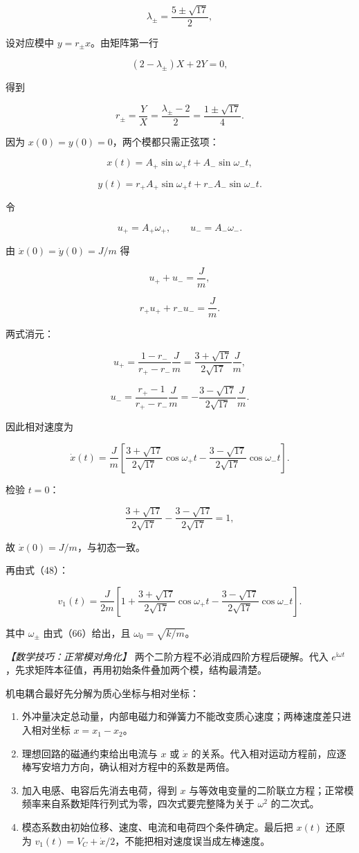 \documentclass[12pt,a4paper,UTF8]{ctexart}
\newcommand{\tightlist}{\setlength{\itemsep}{0pt}\setlength{\parskip}{0pt}}
\begin{document}
\[\lambda_\pm=\frac{5\pm\sqrt{17}}2,\]

设对应模中 \(y=r_\pm x\)。由矩阵第一行

\[(2-\lambda_\pm)X+2Y=0,\]

得到

\[r_\pm=\frac{Y}{X}
=\frac{\lambda_\pm-2}{2}
=\frac{1\pm\sqrt{17}}4. \tag{67a}\]

因为 \(x(0)=y(0)=0\)，两个模都只需正弦项：

\[x(t)=A_+\sin\omega_+t+A_-\sin\omega_-t,\]

\[y(t)=r_+A_+\sin\omega_+t+r_-A_-\sin\omega_-t. \tag{67b}\]

令

\[u_+=A_+\omega_+,\qquad u_-=A_-\omega_-.\]

由 \(\dot x(0)=\dot y(0)=J/m\) 得

\[u_++u_-=\frac Jm,\]

\[r_+u_++r_-u_-=\frac Jm.\]

两式消元：

\[u_+=\frac{1-r_-}{r_+-r_-}\frac Jm
=\frac{3+\sqrt{17}}{2\sqrt{17}}\frac Jm,\]

\[u_-=\frac{r_+-1}{r_+-r_-}\frac Jm
=-\frac{3-\sqrt{17}}{2\sqrt{17}}\frac Jm. \tag{67c}\]

因此相对速度为

\[\dot x(t)=\frac Jm\left[
\frac{3+\sqrt{17}}{2\sqrt{17}}\cos\omega_+t
-\frac{3-\sqrt{17}}{2\sqrt{17}}\cos\omega_-t
\right]. \tag{68}\]

检验 \(t=0\)：

\[\frac{3+\sqrt{17}}{2\sqrt{17}}
-\frac{3-\sqrt{17}}{2\sqrt{17}}=1,\]

故 \(\dot x(0)=J/m\)，与初态一致。

再由式（48）：

\[\boxed{
v_1(t)=\frac{J}{2m}\left[
1+\frac{3+\sqrt{17}}{2\sqrt{17}}\cos\omega_+t
-\frac{3-\sqrt{17}}{2\sqrt{17}}\cos\omega_-t
\right]
}. \tag{69}\]

其中 \(\omega_\pm\) 由式（66）给出，且 \(\omega_0=\sqrt{k/m}\)。

\emph{【数学技巧：正常模对角化】}
两个二阶方程不必消成四阶方程后硬解。代入
\(e^{\mathrm i\omega t}\)，先求矩阵本征值，再用初始条件叠加两个模，结构最清楚。

机电耦合最好先分解为质心坐标与相对坐标：

\begin{enumerate}
\def\labelenumi{\arabic{enumi}.}
\tightlist
\item
  外冲量决定总动量，内部电磁力和弹簧力不能改变质心速度；两棒速度差只进入相对坐标
  \(x=x_1-x_2\)。
\item
  理想回路的磁通约束给出电流与 \(x\) 或 \(\dot x\)
  的关系。代入相对运动方程前，应逐棒写安培力方向，确认相对方程中的系数是两倍。
\item
  加入电感、电容后先消去电荷，得到 \(x\)
  与等效电变量的二阶联立方程；正常模频率来自系数矩阵行列式为零，四次式要完整降为关于
  \(\omega^2\) 的二次式。
\item
  模态系数由初始位移、速度、电流和电荷四个条件确定。最后把 \(x(t)\)
  还原为 \(v_1(t)=V_C+\dot x/2\)，不能把相对速度误当成左棒速度。
\end{enumerate}
\end{document}
